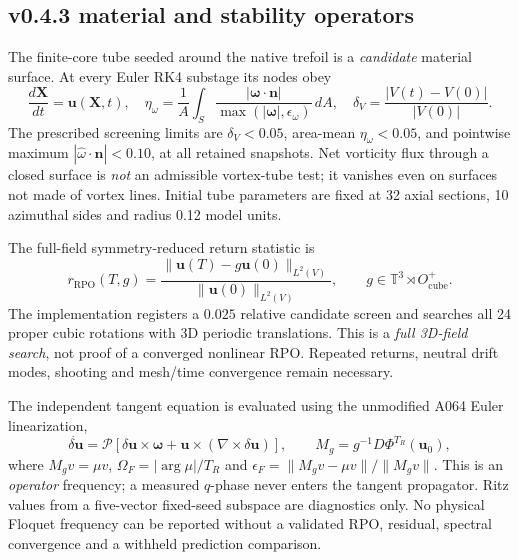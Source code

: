 \documentclass[11pt,a4paper]{article}
\begin{document}
\subsection*{v0.4.3 material and stability operators}
The finite-core tube seeded around the native trefoil is a \emph{candidate} material
surface.  At every Euler RK4 substage its nodes obey
\begin{equation}
\frac{d\mathbf X}{dt}=\mathbf u(\mathbf X,t),\quad
\eta_{\omega}=\frac1A\int_S\frac{|\bm\omega\cdot\mathbf n|}{\max(|\bm\omega|,\epsilon_{\omega})}\,dA,\quad
\delta_V=\frac{|V(t)-V(0)|}{|V(0)|}.
\end{equation}
The prescribed screening limits are $\delta_V<0.05$, area-mean
$\eta_{\omega}<0.05$, and pointwise maximum $|\widehat\omega\cdot\mathbf n|<0.10$,
at all retained snapshots.  Net vorticity flux through a closed surface is
\emph{not} an admissible vortex-tube test; it vanishes even on surfaces not
made of vortex lines.  Initial tube parameters are fixed at 32 axial
sections, 10 azimuthal sides and radius 0.12 model units.

The full-field symmetry-reduced return statistic is
\begin{equation}
 r_{\mathrm{RPO}}(T,g)=\frac{\|\mathbf u(T)-g\mathbf u(0)\|_{L^2(V)}}
 {\|\mathbf u(0)\|_{L^2(V)}},\qquad
 g\in\mathbb T^3\rtimes O^{+}_{\mathrm{cube}}.
\end{equation}
The implementation registers a $0.025$ relative candidate screen and searches
all 24 proper cubic rotations with 3D periodic translations.  This is a
\emph{full 3D-field search}, not proof of a converged nonlinear RPO.
Repeated returns, neutral drift modes, shooting and mesh/time convergence
remain necessary.

The independent tangent equation is evaluated using the unmodified A064
Euler linearization,
\begin{equation}
\dot{\delta\mathbf u}=\mathcal P[\delta\mathbf u\times\bm\omega+
\mathbf u\times(\nabla\times\delta\mathbf u)],\qquad
M_g=g^{-1}D\Phi^{T_R}(\mathbf u_0),
\end{equation}
where $M_gv=\mu v$, $\Omega_F=|\arg\mu|/T_R$ and
$\epsilon_F=\|M_gv-\mu v\|/\|M_gv\|$.  This is an \emph{operator}
frequency; a measured $q$-phase never enters the tangent propagator.
Ritz values from a five-vector fixed-seed subspace are diagnostics only.
No physical Floquet frequency can be reported without a validated RPO,
residual, spectral convergence and a withheld prediction comparison.

\end{document}
